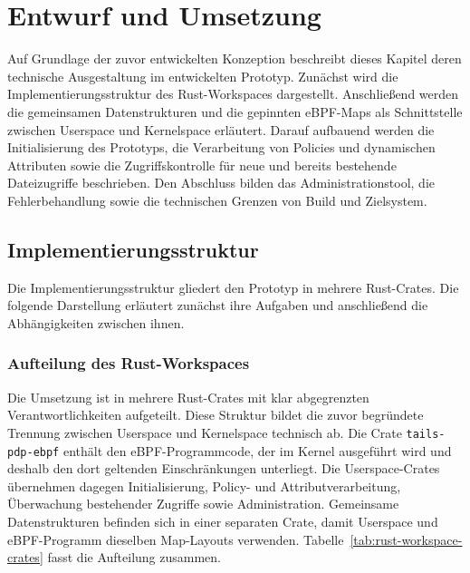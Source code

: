 \section{Entwurf und Umsetzung}

Auf Grundlage der zuvor entwickelten Konzeption beschreibt dieses Kapitel deren technische Ausgestaltung im entwickelten Prototyp.
Zunächst wird die Implementierungsstruktur des Rust-Workspaces dargestellt.
Anschließend werden die gemeinsamen Datenstrukturen und die gepinnten eBPF-Maps als Schnittstelle zwischen Userspace und Kernelspace erläutert.
Darauf aufbauend werden die Initialisierung des Prototyps, die Verarbeitung von Policies und dynamischen Attributen sowie die Zugriffskontrolle für neue und bereits bestehende Dateizugriffe beschrieben.
Den Abschluss bilden das Administrationstool, die Fehlerbehandlung sowie die technischen Grenzen von Build und Zielsystem.

\subsection{Implementierungsstruktur}\label{sec:implementierungsstruktur}
Die Implementierungsstruktur gliedert den Prototyp in mehrere Rust-Crates. Die folgende Darstellung erläutert zunächst ihre Aufgaben und anschließend die Abhängigkeiten zwischen ihnen.

\subsubsection{Aufteilung des Rust-Workspaces}

Die Umsetzung ist in mehrere Rust-Crates mit klar abgegrenzten Verantwortlichkeiten aufgeteilt.
Diese Struktur bildet die zuvor begründete Trennung zwischen Userspace und Kernelspace technisch ab.
Die Crate \texttt{tails-pdp-ebpf} enthält den eBPF-Programmcode, der im Kernel ausgeführt wird und deshalb den dort geltenden Einschränkungen unterliegt.
Die Userspace-Crates übernehmen dagegen Initialisierung, Policy- und Attributverarbeitung, Überwachung bestehender Zugriffe sowie Administration.
Gemeinsame Datenstrukturen befinden sich in einer separaten Crate, damit Userspace und eBPF-Programm dieselben Map-Layouts verwenden. Tabelle~\ref{tab:rust-workspace-crates} fasst die Aufteilung zusammen.

